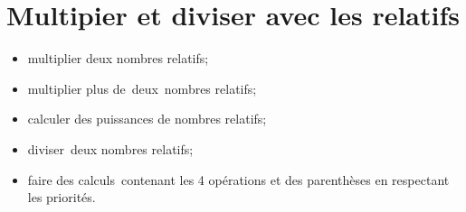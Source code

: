 \chapter{Multipier et diviser avec les relatifs}\label{ChMultDivRelatifs}

\vspace{5cm}

\begin{acquis}
\begin{itemize}
\item multiplier deux nombres relatifs;
\item multiplier plus de deux nombres relatifs;
\item calculer des puissances de nombres relatifs;
\item diviser deux nombres relatifs;
\item faire des calculs contenant les 4 opérations et des parenthèses en respectant les priorités.
\end{itemize}
\end{acquis}


\activites



\cours


\exercicesbase
\begin{colonne*exercice}

\end{colonne*exercice}


\exercicesappr
\begin{colonne*exercice}

\end{colonne*exercice}

\connaissances


\TravauxPratiques %


\pagebreak

\recreation



